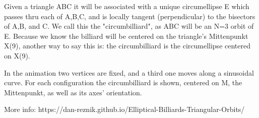 Given a triangle ABC it will be associated with a unique circumellipse E which passes thru each of A,B,C, and is locally tangent (perpendicular) to the bisectors of A,B, and C. We call this the "circumbilliard", as ABC will be an N=3 orbit of E. Because we know the billiard will be centered on the triangle's Mittenpunkt X(9), another way to say this is: the circumbilliard is the circumellipse centered on X(9).

In the animation two vertices are fixed, and a third one moves along a sinusoidal curve. For each configuration the circumbilliard is shown, centered on M, the Mittenpunkt, as well as its axes' orientation.

More info: https://dan-reznik.github.io/Elliptical-Billiards-Triangular-Orbits/